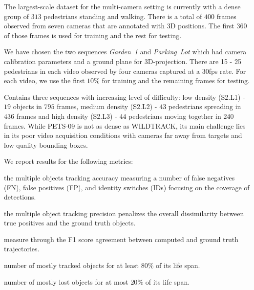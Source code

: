\begin{packed_description}
\item[- \normalfont\textit{WILDTRACK}~\cite{chavdarova2018wildtrack}:]
The largest-scale dataset for the multi-camera setting is currently with a dense group of $313$ pedestrians standing and walking.
There is a total of $400$ frames observed from seven cameras that are annotated with 3D positions.
The first $360$ of those frames is used for training and the rest for testing. 
\item[- \normalfont\textit{Campus}~\cite{xu2016multi}:] We have chosen the two sequences \textit{Garden~1} and \textit{Parking~Lot} which had camera calibration parameters and a ground plane for 3D-projection. There are 15 - 25 pedestrians in each video observed by four cameras captured at a 30fps rate.
For each video, we use the first $10\%$ for training and the remaining frames for testing. 
\item[- \normalfont\textit{PETS-09}~\cite{ellis2009pets2009}:]
Contains three sequences with increasing level of difficulty:
low density (S2.L1) - $19$ objects in $795$ frames, medium density (S2.L2) - $43$ pedestrians spreading in $436$ frames and high density (S2.L3) - $44$ pedestrians moving together in $240$ frames.
While PETS-09 is not as dense as WILDTRACK, its main challenge lies in its poor video acquisition conditions with cameras far away from targets and low-quality bounding boxes. 
\end{packed_description}
\vspace{-0.1in}
We report results for the following metrics:
\begin{packed_description}
\item[- \normalfont MOTA~\cite{bernardin2008evaluating}:] the multiple objects tracking accuracy measuring a number of false negatives (FN), false positives (FP), and identity switches (IDs) focusing on the coverage of detections. 
\item[- \normalfont MOTP~\cite{bernardin2008evaluating}:]
the multiple object tracking precision penalizes the overall dissimilarity between true positives and the ground truth objects.
\item[- \normalfont IDF1~\cite{ristani2014tracking}:] 
measure through the F1 score agreement between computed and ground truth trajectories.
\item[- \normalfont MT \cite{li2009learning}:] number of mostly tracked objects for at least $80\%$ of its life span.
\item[- \normalfont ML \cite{li2009learning}:] number of mostly lost objects for at most $20\%$ of its life span.
\end{packed_description}
